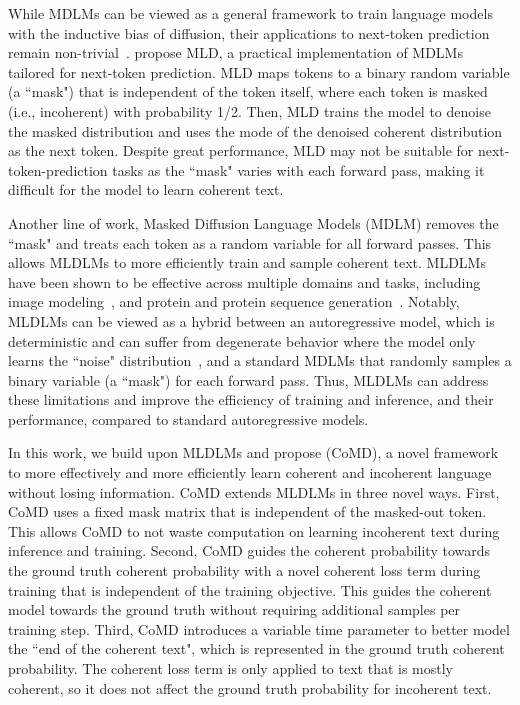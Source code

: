 \documentclass{article} %
\begin{document}
While MDLMs can be viewed as a general framework to train language models with the inductive bias of diffusion, their applications to next-token prediction remain non-trivial~\citep{austin2023structured, shih2022training}. \citet{austin2023structured} propose MLD, a practical implementation of MDLMs tailored for next-token prediction. MLD maps tokens to a binary random variable (a ``mask") that is independent of the token itself, where each token is masked (i.e., incoherent) with probability 1/2. Then, MLD trains the model to denoise the masked distribution and uses the mode of the denoised coherent distribution as the next token. Despite great performance, MLD may not be suitable for next-token-prediction tasks as the ``mask" varies with each forward pass, making it difficult for the model to learn coherent text. 

Another line of work, Masked Diffusion Language Models (MDLM) removes the ``mask" and treats each token as a random variable for all forward passes. This allows MLDLMs to more efficiently train and sample coherent text. MLDLMs have been shown to be effective across multiple domains and tasks, including image modeling~\citep{austin2023structured}, and protein and protein sequence generation~\citep{wang2024diffusion}. Notably, MLDLMs can be viewed as a hybrid between an autoregressive model, which is deterministic and can suffer from degenerate behavior where the model only learns the ``noise" distribution~\citep{hoogeboom2021argmax}, and a standard MDLMs that randomly samples a binary variable (a ``mask") for each forward pass. Thus, MLDLMs can address these limitations and improve the efficiency of training and inference, and their performance, compared to standard autoregressive models. 

In this work, we build upon MLDLMs and propose (CoMD), a novel framework to more effectively and more efficiently learn coherent and incoherent language without losing information. CoMD extends MLDLMs in three novel ways. First, CoMD uses a fixed mask matrix that is independent of the masked-out token. This allows CoMD to not waste computation on learning incoherent text during inference and training. Second, CoMD guides the coherent probability towards the ground truth coherent probability with a novel coherent loss term during training that is independent of the training objective. This guides the coherent model towards the ground truth without requiring additional samples per training step. Third, CoMD introduces a variable time parameter to better model the ``end of the coherent text", which is represented in the ground truth coherent probability. The coherent loss term is only applied to text that is mostly coherent, so it does not affect the ground truth probability for incoherent text. 
\end{document}
